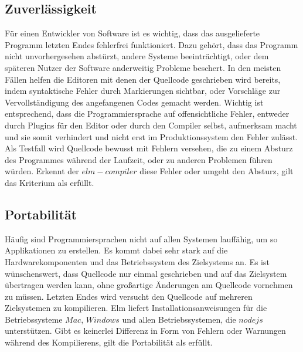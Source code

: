 \subsection{Zuverlässigkeit}
\label{sec:muster_zuverlaessigkeit}
Für einen Entwickler von Software ist es wichtig, dass das ausgelieferte Programm letzten Endes fehlerfrei funktioniert. Dazu gehört, dass das Programm nicht unvorhergesehen abstürzt, andere Systeme beeinträchtigt, oder dem späteren Nutzer der Software anderweitig Probleme beschert. In den meisten Fällen helfen die Editoren mit denen der Quellcode geschrieben wird bereits, indem syntaktische Fehler durch Markierungen sichtbar, oder Vorschläge zur Vervollständigung des angefangenen Codes gemacht werden. Wichtig ist entsprechend, dass die Programmiersprache auf offensichtliche Fehler, entweder durch Plugins für den Editor oder durch den Compiler selbst, aufmerksam macht und sie somit verhindert und nicht erst im Produktionssystem den Fehler zulässt. Als Testfall wird Quellcode bewusst mit Fehlern versehen, die zu einem Absturz des Programmes während der Laufzeit, oder zu anderen Problemen führen würden. Erkennt der $elm-compiler$ diese Fehler oder umgeht den Absturz, gilt das Kriterium als erfüllt.


\subsection{Portabilität}
\label{sec:muster_portabilitaet}
Häufig sind Programmiersprachen nicht auf allen Systemen lauffähig, um so Applikationen zu erstellen. Es kommt dabei sehr stark auf die Hardwarekomponenten und das Betriebssystem des Zielsystems an. Es ist wünschenswert, dass Quellcode nur einmal geschrieben und auf das Zielsystem übertragen werden kann, ohne großartige Änderungen am Quellcode vornehmen zu müssen. Letzten Endes wird versucht den Quellcode auf mehreren Zielsystemen zu kompilieren. Elm liefert Installationsanweisungen für die Betriebssysteme $Mac$, $Windows$ und allen Betriebssystemen, die $nodejs$ unterstützen. Gibt es keinerlei Differenz in Form von Fehlern oder Warnungen während des Kompilierens, gilt die Portabilität als erfüllt.


